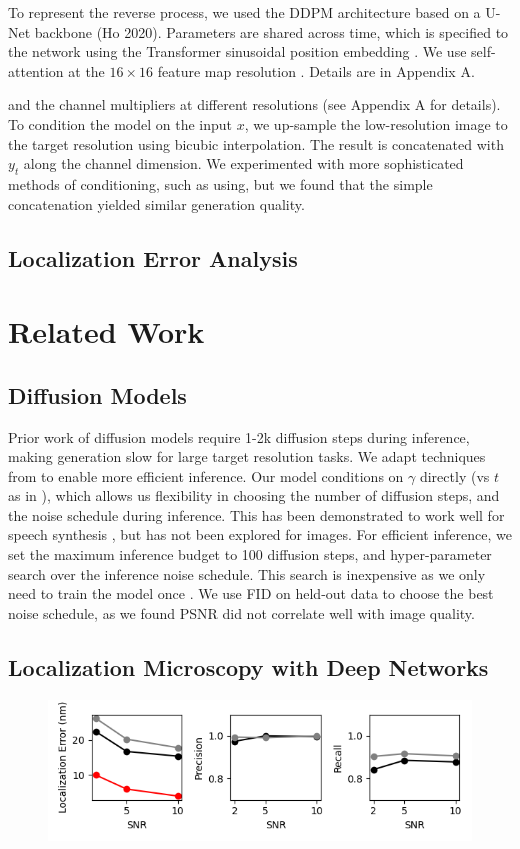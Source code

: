 \documentclass{article}
\begin{document}
To represent the reverse process, we used the DDPM architecture based on a U-Net backbone (Ho 2020). Parameters are shared across time, which is specified to the network using the Transformer sinusoidal position embedding \cite{cite60}. We use self-attention at the $16 \times 16$ feature map resolution \cite{cite63,cite60}. Details are in Appendix A.

and the channel multipliers at different resolutions (see Appendix A for details). To condition the model on the input $x$, we up-sample the low-resolution image to the target resolution using bicubic interpolation. The result is concatenated with $y_t$ along the channel dimension. We experimented with more sophisticated methods of conditioning, such as using, but we found that the simple concatenation yielded similar generation quality.

\subsection{Localization Error Analysis}


\section{Related Work}

\subsection{Diffusion Models}

Prior work of diffusion models \cite{ref17, ref51} require 1-2k diffusion steps during inference, making generation slow for large target resolution tasks. We adapt techniques from \cite{ref6} to enable more efficient inference. Our model conditions on $\gamma$ directly (vs $t$ as in \cite{ref17}), which allows us flexibility in choosing the number of diffusion steps, and the noise schedule during inference. This has been demonstrated to work well for speech synthesis \cite{ref6}, but has not been explored for images. For efficient inference, we set the maximum inference budget to 100 diffusion steps, and hyper-parameter search over the inference noise schedule. This search is inexpensive as we only need to train the model once \cite{ref6}. We use FID on held-out data to choose the best noise schedule, as we found PSNR did not correlate well with image quality.

\subsection{Localization Microscopy with Deep Networks}



\begin{figure}
\includegraphics[scale=1.0]{Errors.png}
\end{figure}
\end{document}
